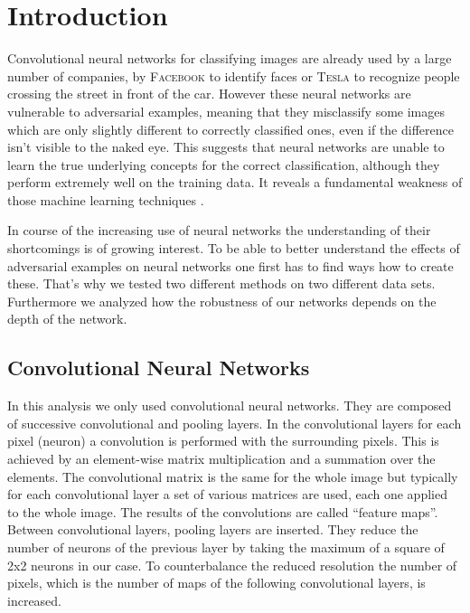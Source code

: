 \documentclass[%
 reprint,
 amsmath,amssymb,
 aps,
]{revtex4-1}
\begin{document}

\section{Introduction}

Convolutional neural networks for classifying images are already used by a large number of companies, by \textsc{Facebook} to identify faces or \textsc{Tesla} to recognize people crossing the street in front of the car. 
However these neural networks are vulnerable to adversarial examples, meaning that they misclassify some images which are only slightly different to correctly classified ones, even if the difference isn't visible to the naked eye. This suggests that neural networks are unable to learn the true underlying concepts for the correct classification, although they perform extremely well on the training data. It reveals a fundamental weakness of those machine learning techniques \cite{paperGrad}.

In course of the increasing use of neural networks the understanding of their shortcomings is of growing interest. To be able to better understand the effects of adversarial examples on neural networks one first has to find ways how to create these. That's why we tested two different methods on two different data sets. Furthermore we analyzed how the robustness of our networks depends on the depth of the network.

\subsection{Convolutional Neural Networks}


In this analysis we only used convolutional neural networks. They are composed of successive convolutional and pooling layers. In the convolutional layers for each pixel (neuron) a convolution is performed with the surrounding pixels. This is achieved by an element-wise matrix multiplication and a summation over the elements. The convolutional matrix is the same for the whole image but typically for each convolutional layer a set of various matrices are used, each one applied to the whole image. The results of the convolutions are called ``feature maps''. Between convolutional layers, pooling layers are inserted. They reduce the number of neurons of the previous layer by taking the maximum of a square of 2x2 neurons in our case. To counterbalance the reduced resolution the number of pixels, which is the number of maps of the following convolutional layers, is increased.
\end{document}
